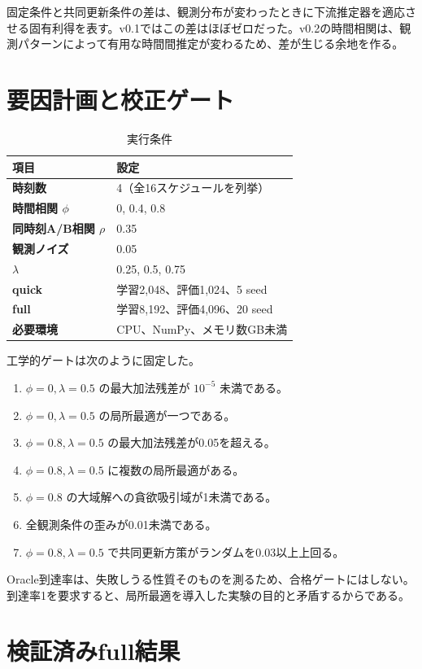 \documentclass[11pt,a4paper]{ltjsarticle}
\begin{document}
固定条件と共同更新条件の差は、観測分布が変わったときに下流推定器を適応させる固有利得を表す。v0.1ではこの差はほぼゼロだった。v0.2の時間相関は、観測パターンによって有用な時間間推定が変わるため、差が生じる余地を作る。

\section{要因計画と校正ゲート}

\begin{table}[ht]
\centering
\caption{実行条件}
\begin{tabularx}{0.92\linewidth}{>{\bfseries}lX}
\toprule
項目 & 設定 \\
\midrule
時刻数 & 4（全16スケジュールを列挙） \\
時間相関 $\phi$ & 0, 0.4, 0.8 \\
同時刻A/B相関 $\rho$ & 0.35 \\
観測ノイズ & 0.05 \\
$\lambda$ & 0.25, 0.5, 0.75 \\
quick & 学習2,048、評価1,024、5 seed \\
full & 学習8,192、評価4,096、20 seed \\
必要環境 & CPU、NumPy、メモリ数GB未満 \\
\bottomrule
\end{tabularx}
\end{table}

工学的ゲートは次のように固定した。
\begin{enumerate}
\item $\phi=0,\lambda=0.5$ の最大加法残差が $10^{-5}$ 未満である。
\item $\phi=0,\lambda=0.5$ の局所最適が一つである。
\item $\phi=0.8,\lambda=0.5$ の最大加法残差が0.05を超える。
\item $\phi=0.8,\lambda=0.5$ に複数の局所最適がある。
\item $\phi=0.8$ の大域解への貪欲吸引域が1未満である。
\item 全観測条件の歪みが0.01未満である。
\item $\phi=0.8,\lambda=0.5$ で共同更新方策がランダムを0.03以上上回る。
\end{enumerate}

Oracle到達率は、失敗しうる性質そのものを測るため、合格ゲートにはしない。到達率1を要求すると、局所最適を導入した実験の目的と矛盾するからである。

\section{検証済みfull結果}
\end{document}

